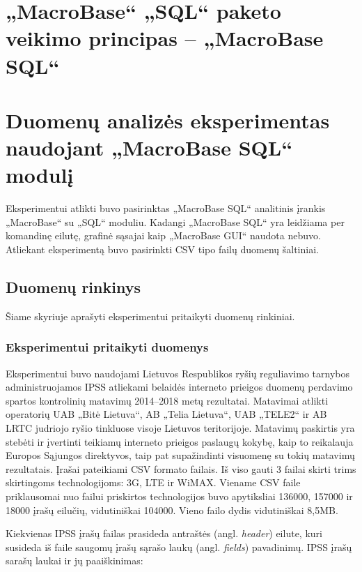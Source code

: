 \documentclass{VUMIFPSbakalaurinis}
\begin{document}
\section{„MacroBase“ „SQL“ paketo veikimo principas – „MacroBase SQL“} \label{sec:macrobasesql}




\section{Duomenų analizės eksperimentas naudojant „MacroBase SQL“ modulį}
Eksperimentui atlikti buvo pasirinktas „MacroBase SQL“ analitinis įrankis „MacroBase“ su „SQL“ moduliu. Kadangi „MacroBase SQL“ yra leidžiama per komandinę eilutę, grafinė sąsajai kaip „MacroBase GUI“ naudota nebuvo. Atliekant eksperimentą buvo pasirinkti CSV tipo failų duomenų šaltiniai.

\subsection{Duomenų rinkinys}
Šiame skyriuje aprašyti eksperimentui pritaikyti duomenų rinkiniai.

\subsubsection{Eksperimentui pritaikyti duomenys}
Eksperimentui buvo naudojami Lietuvos Respublikos ryšių reguliavimo tarnybos administruojamos IPSS atliekami belaidės interneto prieigos duomenų perdavimo spartos kontrolinių matavimų 2014–2018 metų rezultatai. Matavimai atlikti operatorių UAB „Bitė Lietuva“, AB „Telia Lietuva“, UAB „TELE2“ ir AB LRTC judriojo ryšio tinkluose visoje Lietuvos teritorijoje. Matavimų paskirtis yra stebėti ir įvertinti teikiamų interneto prieigos paslaugų kokybę, kaip to reikalauja Europos Sąjungos direktyvos, taip pat supažindinti visuomenę su tokių matavimų rezultatais. Įrašai pateikiami CSV formato failais. Iš viso gauti 3 failai skirti trims skirtingoms technologijoms: 3G, LTE ir WiMAX. Viename CSV faile priklausomai nuo failui priskirtos technologijos buvo apytiksliai 136000, 157000 ir 18000 įrašų eilučių, vidutiniškai 104000. Vieno failo dydis vidutiniškai 8,5MB.

Kiekvienas IPSS įrašų failas prasideda antraštės (angl. \textit{header}) eilute, kuri susideda iš faile saugomų įrašų sąrašo laukų (angl. \textit{fields}) pavadinimų. IPSS įrašų sarašų laukai ir jų paaiškinimas:
\end{document}
